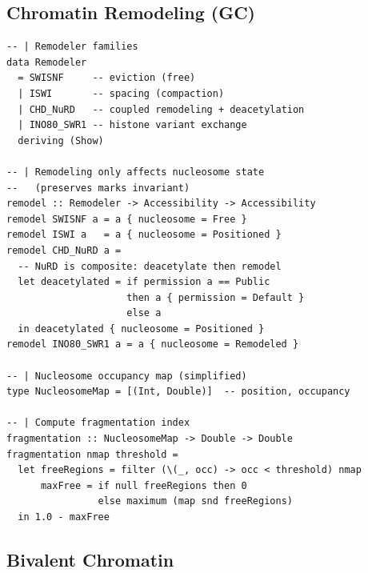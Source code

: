 \documentclass[12pt,a4paper]{article}
\begin{document}
\subsection{Chromatin Remodeling (GC)}

\begin{lstlisting}[caption={Chromatin remodeling as garbage collection}]
-- | Remodeler families
data Remodeler
  = SWISNF     -- eviction (free)
  | ISWI       -- spacing (compaction)
  | CHD_NuRD   -- coupled remodeling + deacetylation
  | INO80_SWR1 -- histone variant exchange
  deriving (Show)

-- | Remodeling only affects nucleosome state
--   (preserves marks invariant)
remodel :: Remodeler -> Accessibility -> Accessibility
remodel SWISNF a = a { nucleosome = Free }
remodel ISWI a   = a { nucleosome = Positioned }
remodel CHD_NuRD a =
  -- NuRD is composite: deacetylate then remodel
  let deacetylated = if permission a == Public
                     then a { permission = Default }
                     else a
  in deacetylated { nucleosome = Positioned }
remodel INO80_SWR1 a = a { nucleosome = Remodeled }

-- | Nucleosome occupancy map (simplified)
type NucleosomeMap = [(Int, Double)]  -- position, occupancy

-- | Compute fragmentation index
fragmentation :: NucleosomeMap -> Double -> Double
fragmentation nmap threshold =
  let freeRegions = filter (\(_, occ) -> occ < threshold) nmap
      maxFree = if null freeRegions then 0
                else maximum (map snd freeRegions)
  in 1.0 - maxFree
\end{lstlisting}

\subsection{Bivalent Chromatin}
\end{document}

